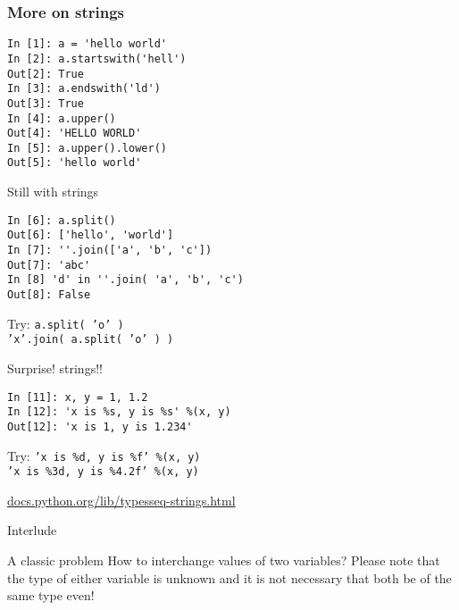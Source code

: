 \documentclass[14pt,compress]{beamer}
\newcounter{time}
\newcommand{\inctime}[1]{\addtocounter{time}{#1}{\tiny \thetime\ m}}
\begin{document}
\begin{frame}[fragile]
  \frametitle{More on strings}
  \begin{lstlisting}
In [1]: a = 'hello world'
In [2]: a.startswith('hell')
Out[2]: True
In [3]: a.endswith('ld')
Out[3]: True
In [4]: a.upper()
Out[4]: 'HELLO WORLD'
In [5]: a.upper().lower()
Out[5]: 'hello world'
  \end{lstlisting}
\end{frame}

\begin{frame}[fragile]{Still with strings}
  \begin{lstlisting}
In [6]: a.split()
Out[6]: ['hello', 'world']
In [7]: ''.join(['a', 'b', 'c'])
Out[7]: 'abc'
In [8] 'd' in ''.join( 'a', 'b', 'c')
Out[8]: False
  \end{lstlisting}
  \begin{block}{Try:}
    \texttt{a.split( 'o' )}\\
    \texttt{'x'.join( a.split( 'o' ) )}
  \end{block}
\end{frame}

\begin{frame}[fragile]{Surprise! strings!!}
  \begin{lstlisting}
In [11]: x, y = 1, 1.2
In [12]: 'x is %s, y is %s' %(x, y)
Out[12]: 'x is 1, y is 1.234'
  \end{lstlisting}
  \begin{block}{Try:}
    \texttt{'x is \%d, y is \%f' \%(x, y) }\\
    \texttt{'x is \%3d, y is \%4.2f' \%(x, y) }
  \end{block}
  \small
\url{docs.python.org/lib/typesseq-strings.html}\\
\end{frame}

\begin{frame}
  {Interlude}
  \begin{block}
    {A classic problem}
    How to interchange values of two variables? Please note that the type of either variable is unknown and it is not necessary that both be of the same type even!
  \end{block}
  \inctime{30}
\end{frame}

\end{document}
